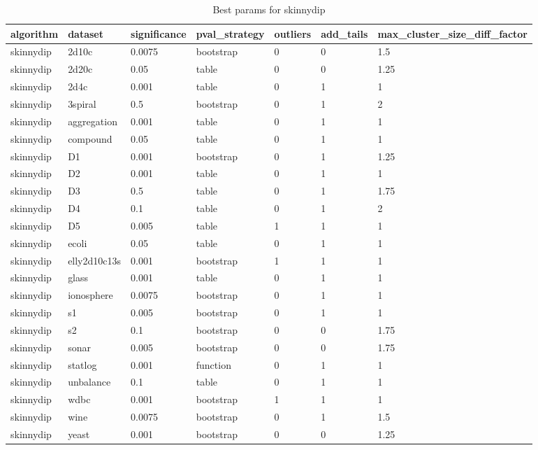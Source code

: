 \begin{table}[H]
\centering
\caption{Best params for skinnydip}
\label{tab:params:skinnydip}
\begin{tabular}{|l|l|l|l|l|l|l|}
\hline
algorithm & dataset & significance & pval\_strategy & outliers & add\_tails & max\_cluster\_size\_diff\_factor \\
\hline
skinnydip & 2d10c & 0.0075 & bootstrap & 0 & 0 & 1.5 \\
\hline
skinnydip & 2d20c & 0.05 & table & 0 & 0 & 1.25 \\
\hline
skinnydip & 2d4c & 0.001 & table & 0 & 1 & 1 \\
\hline
skinnydip & 3spiral & 0.5 & bootstrap & 0 & 1 & 2 \\
\hline
skinnydip & aggregation & 0.001 & table & 0 & 1 & 1 \\
\hline
skinnydip & compound & 0.05 & table & 0 & 1 & 1 \\
\hline
skinnydip & D1 & 0.001 & bootstrap & 0 & 1 & 1.25 \\
\hline
skinnydip & D2 & 0.001 & table & 0 & 1 & 1 \\
\hline
skinnydip & D3 & 0.5 & table & 0 & 1 & 1.75 \\
\hline
skinnydip & D4 & 0.1 & table & 0 & 1 & 2 \\
\hline
skinnydip & D5 & 0.005 & table & 1 & 1 & 1 \\
\hline
skinnydip & ecoli & 0.05 & table & 0 & 1 & 1 \\
\hline
skinnydip & elly2d10c13s & 0.001 & bootstrap & 1 & 1 & 1 \\
\hline
skinnydip & glass & 0.001 & table & 0 & 1 & 1 \\
\hline
skinnydip & ionosphere & 0.0075 & bootstrap & 0 & 1 & 1 \\
\hline
skinnydip & s1 & 0.005 & bootstrap & 0 & 1 & 1 \\
\hline
skinnydip & s2 & 0.1 & bootstrap & 0 & 0 & 1.75 \\
\hline
skinnydip & sonar & 0.005 & bootstrap & 0 & 0 & 1.75 \\
\hline
skinnydip & statlog & 0.001 & function & 0 & 1 & 1 \\
\hline
skinnydip & unbalance & 0.1 & table & 0 & 1 & 1 \\
\hline
skinnydip & wdbc & 0.001 & bootstrap & 1 & 1 & 1 \\
\hline
skinnydip & wine & 0.0075 & bootstrap & 0 & 1 & 1.5 \\
\hline
skinnydip & yeast & 0.001 & bootstrap & 0 & 0 & 1.25 \\
\hline
\end{tabular}
\end{table}